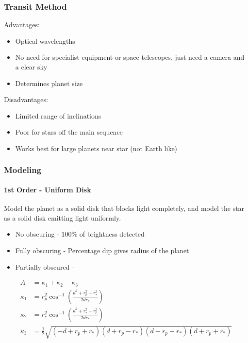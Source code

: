 \documentclass{beamer}
\begin{document}
  \begin{frame}
    \frametitle{Transit Method}
    Advantages:
    \begin{itemize}
        \item Optical wavelengths
        \item No need for specialist equipment or space telescopes, just need a camera and a clear sky
        \item Determines planet size
    \end{itemize}
    Disadvantages:
    \begin{itemize}
        \item Limited range of inclinations
        \item Poor for stars off the main sequence
        \item Works best for large planets near star (not Earth like)
    \end{itemize}
  \end{frame}
  \begin{frame}
    \frametitle{Modeling}
    \framesubtitle{1st Order - Uniform Disk}
    Model the planet as a solid disk that blocks light completely, and model the star as a solid disk emitting light uniformly.
    \begin{itemize}
        \item No obscuring - 100\% of brightness detected
        \item Fully obscuring - Percentage dip gives radius of the planet
        \item Partially obscured -
    \end{itemize}
    \small
    \begin{align*}
    A &= \kappa_1 + \kappa_2 - \kappa_3 \\
    \kappa_1 &= r_p^2\cos^{-1}\left(\frac{d^2 + r_p^2 - r_*^2}{2dr_p}\right)\\
    \kappa_2 &= r_*^2\cos^{-1}\left(\frac{d^2 + r_*^2 - r_p^2}{2dr_*}\right)\\
        \kappa_3 &= \frac{1}{2}\sqrt{(-d + r_p + r_*)(d + r_p - r_*)(d - r_p + r_*)(d + r_p + r_*)}
    \end{align*}
  \end{frame}
\end{document}
